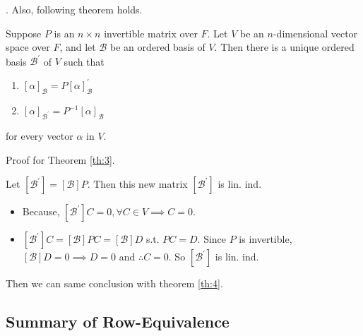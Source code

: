 \documentclass[8pt]{beamer}
\newcommand{\mc}[1]{\mathcal{#1}}
\begin{document}
\begin{frame}{.}
    Also, following theorem holds.
    \begin{theorem} \label{th:3}
        Suppose $P$ is an $n \times n$ invertible matrix over $F$. Let $V$ be an $n$-dimensional vector space over $F$, and let $\mc{B}$ be an ordered basis of $V$. Then there is a unique ordered basis $\mc{B}^\prime$ of $V$ such that
        \begin{enumerate}
            \item $[\alpha]_{\mc{B}} = P [\alpha]_{\mc{B}}^\prime$
            \item $[\alpha]_{\mc{B}^\prime} = P^{-1} [\alpha]_{\mc{B}}$
        \end{enumerate}
        for every vector $\alpha$ in $V$.
    \end{theorem}

    Proof for Theorem \ref{th:3}.

    Let $[\mc{B}^\prime] = [\mc{B}] P$. Then this new matrix $[\mc{B}^\prime]$ is lin. ind.
    \begin{itemize}
        \item Because, $[\mc{B}^\prime] C = 0, \forall C \in V \implies C = 0$.
        \item $[\mc{B}^\prime]C = [\mc{B}]PC = [\mc{B}]D$ s.t. $PC = D$. Since $P$ is invertible, $[\mc{B}]D = 0 \implies D = 0$ and $\therefore C = 0$. So $[\mc{B}^\prime]$ is lin. ind.
    \end{itemize}
    Then we can same conclusion with theorem \ref{th:4}.

\end{frame}

\subsection{Summary of Row-Equivalence}
\end{document}
